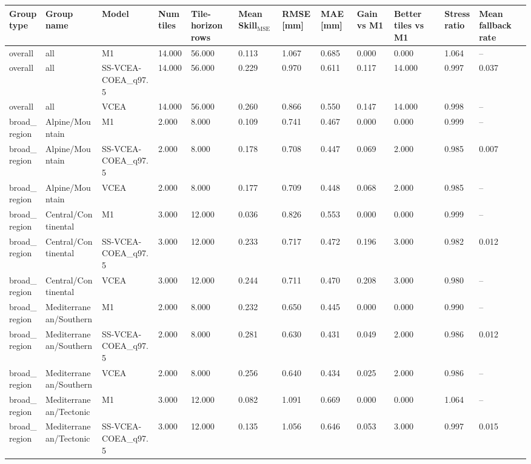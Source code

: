 \begin{table}[t]
\centering
\footnotesize
\begin{tabular}{llllllllllll}
\toprule
Group type & Group name & Model & Num tiles & Tile-horizon rows & Mean Skill$_{\mathrm{MSE}}$ & RMSE [mm] & MAE [mm] & Gain vs M1 & Better tiles vs M1 & Stress ratio & Mean fallback rate \\
\midrule
overall & all & M1 & 14.000 & 56.000 & 0.113 & 1.067 & 0.685 & 0.000 & 0.000 & 1.064 & -- \\
overall & all & SS-VCEA-COEA\_q97.5 & 14.000 & 56.000 & 0.229 & 0.970 & 0.611 & 0.117 & 14.000 & 0.997 & 0.037 \\
overall & all & VCEA & 14.000 & 56.000 & 0.260 & 0.866 & 0.550 & 0.147 & 14.000 & 0.998 & -- \\
broad\_region & Alpine/Mountain & M1 & 2.000 & 8.000 & 0.109 & 0.741 & 0.467 & 0.000 & 0.000 & 0.999 & -- \\
broad\_region & Alpine/Mountain & SS-VCEA-COEA\_q97.5 & 2.000 & 8.000 & 0.178 & 0.708 & 0.447 & 0.069 & 2.000 & 0.985 & 0.007 \\
broad\_region & Alpine/Mountain & VCEA & 2.000 & 8.000 & 0.177 & 0.709 & 0.448 & 0.068 & 2.000 & 0.985 & -- \\
broad\_region & Central/Continental & M1 & 3.000 & 12.000 & 0.036 & 0.826 & 0.553 & 0.000 & 0.000 & 0.999 & -- \\
broad\_region & Central/Continental & SS-VCEA-COEA\_q97.5 & 3.000 & 12.000 & 0.233 & 0.717 & 0.472 & 0.196 & 3.000 & 0.982 & 0.012 \\
broad\_region & Central/Continental & VCEA & 3.000 & 12.000 & 0.244 & 0.711 & 0.470 & 0.208 & 3.000 & 0.980 & -- \\
broad\_region & Mediterranean/Southern & M1 & 2.000 & 8.000 & 0.232 & 0.650 & 0.445 & 0.000 & 0.000 & 0.990 & -- \\
broad\_region & Mediterranean/Southern & SS-VCEA-COEA\_q97.5 & 2.000 & 8.000 & 0.281 & 0.630 & 0.431 & 0.049 & 2.000 & 0.986 & 0.012 \\
broad\_region & Mediterranean/Southern & VCEA & 2.000 & 8.000 & 0.256 & 0.640 & 0.434 & 0.025 & 2.000 & 0.986 & -- \\
broad\_region & Mediterranean/Tectonic & M1 & 3.000 & 12.000 & 0.082 & 1.091 & 0.669 & 0.000 & 0.000 & 1.064 & -- \\
broad\_region & Mediterranean/Tectonic & SS-VCEA-COEA\_q97.5 & 3.000 & 12.000 & 0.135 & 1.056 & 0.646 & 0.053 & 3.000 & 0.997 & 0.015 \\

\end{tabular}
\end{table}
